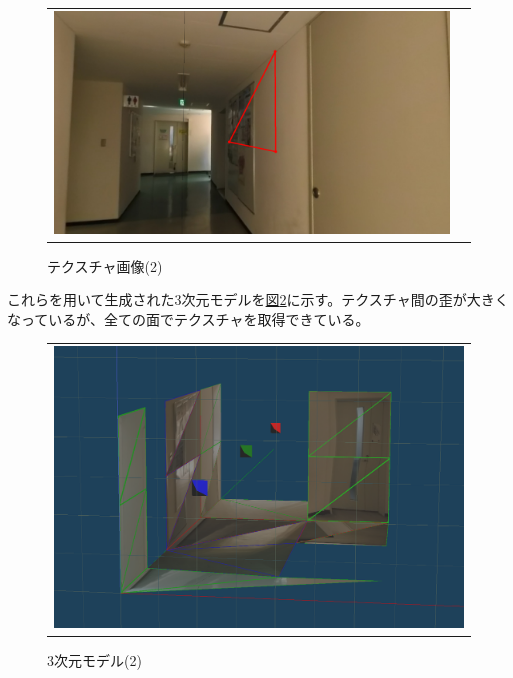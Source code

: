 \documentclass[]{jarticle}          %
\begin{document}
\begin{figure}[H]
\begin{center}
\begin{tabular}{cc}
      \includegraphics[keepaspectratio, scale=0.1]{figures/texture2/texture/texture_2_17.png}\\
    \end{tabular}
  \end{center}
  \caption{テクスチャ画像(2)}
  \label{three}
\end{figure}

これらを用いて生成された3次元モデルを\hyperref[four]{図\ref{four}}に示す。テクスチャ間の歪が大きくなっているが、全ての面でテクスチャを取得できている。

\begin{figure}[H]
  \begin{center}
    \begin{tabular}{c}
      \includegraphics[keepaspectratio, scale=0.3]{figures/C5F2.png}
    \end{tabular}
  \end{center}
  \caption{3次元モデル(2)}
  \label{four}
\end{figure}
\end{document}
